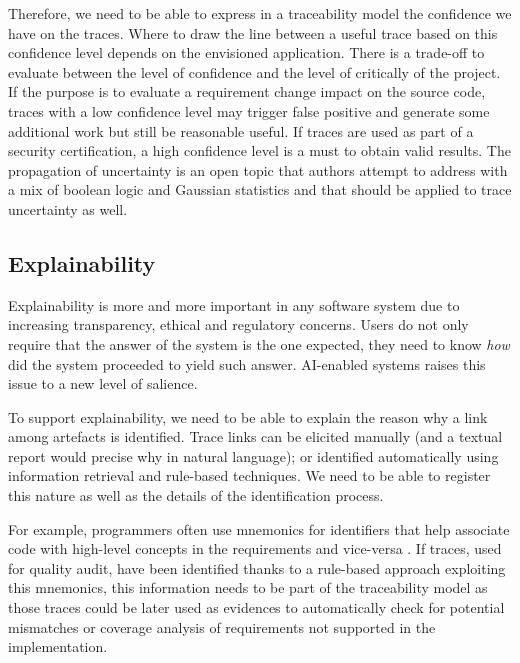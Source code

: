 Therefore, we need to be able to express in a traceability model the confidence we have on the traces. Where to draw the line between a useful trace based on this confidence level depends on the envisioned application. There is a trade-off to evaluate between the level of confidence and the level of critically of the project. If the purpose is to evaluate a requirement change impact on the source code, traces with a low confidence level may trigger false positive and generate some additional work but still be reasonable useful. If traces are used as part of a security certification, a high confidence level is a must to obtain valid results. 
The propagation of uncertainty is an open topic that authors attempt to address with a  mix of boolean logic and Gaussian statistics \cite{burgueno2018-uncertainty-confidence-in-mdd} and that should be applied to trace uncertainty as well.


\subsection{Explainability}
Explainability is more and more important in any software system due to increasing transparency, ethical and regulatory concerns. Users do not only require that the answer of the system is the one expected, they need to know \textit{how} did the system proceeded to yield such answer. AI-enabled systems raises this issue to a new level of salience.

To support explainability, we need to be able to explain the reason why a link among artefacts is identified. Trace links can be elicited manually (and a textual report would precise why in natural language); or identified automatically using information retrieval and rule-based techniques. We need to be able to register this nature as well as the details of the identification process.

For example, programmers often use mnemonics for identifiers that help associate code with high-level concepts in the requirements and vice-versa \cite{antoniol2002-tracing-code-documentation-links}.
If traces, used for quality audit, have been identified thanks to a rule-based approach exploiting this mnemonics, this information needs to be part of the traceability model as those traces could be later used as evidences to automatically check for potential mismatches or coverage analysis of requirements not supported in the implementation.



